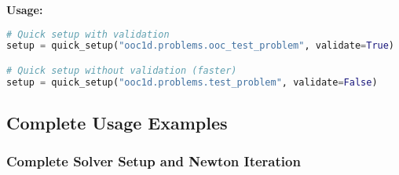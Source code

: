 \textbf{Usage:}
\begin{lstlisting}[language=Python, caption=Quick Setup Usage]
# Quick setup with validation
setup = quick_setup("ooc1d.problems.ooc_test_problem", validate=True)

# Quick setup without validation (faster)
setup = quick_setup("ooc1d.problems.test_problem", validate=False)
\end{lstlisting}

\subsection{Complete Usage Examples}
\label{subsec:complete_usage_examples_detailed}

\subsubsection{Complete Solver Setup and Newton Iteration}

